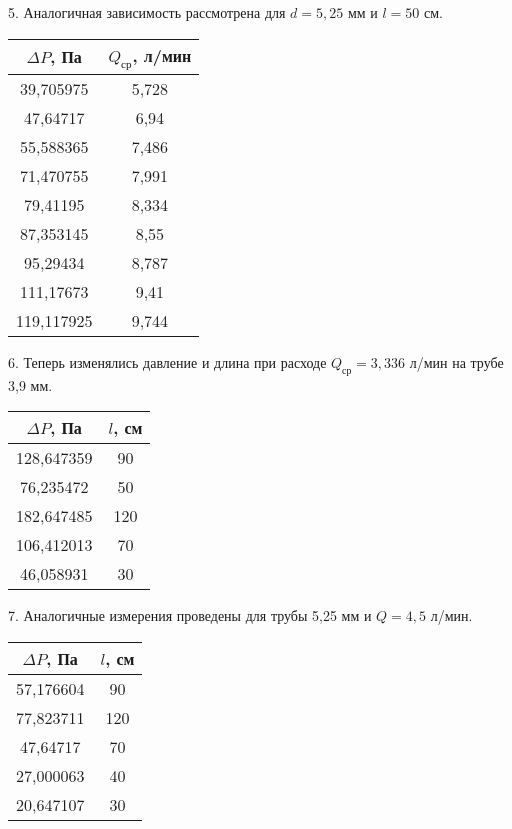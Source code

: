 5. Аналогичная зависимость рассмотрена для $d = 5,25$ мм и $l = 50$ см.
\begin{center}
\begin{tabular}[h]{|c|c|}
   \hline
    $\Delta P$, Па & $Q_\text{ср}$, л/мин\\
   \hline
    39,705975 & 5,728 \\
    \hline
    47,64717 & 6,94 \\
    \hline
    55,588365 & 7,486 \\
    \hline
    71,470755 & 7,991 \\
    \hline
    79,41195 & 8,334 \\
    \hline
    87,353145 & 8,55 \\
    \hline
    95,29434 & 8,787 \\
    \hline
    111,17673 & 9,41 \\
    \hline
    119,117925 & 9,744 \\
    \hline
\end{tabular}
\end{center}

6. Теперь изменялись давление и длина при расходе $Q_\text{ср} = 3,336$ л/мин на трубе 3,9 мм.
\begin{center}
\begin{tabular}[h]{|c|c|}
    \hline
    $\Delta P$, Па & $l$, см \\
    \hline
    128,647359 & 90 \\
   \hline
   76,235472 & 50 \\
   \hline
   182,647485 & 120 \\
   \hline
   106,412013 & 70 \\
   \hline
   46,058931 & 30 \\
   \hline
\end{tabular}
\end{center}

7. Аналогичные измерения проведены для трубы 5,25 мм и $Q = 4,5$ л/мин.
\begin{center}
\begin{tabular}[h]{|c|c|}
    \hline
    $\Delta P$, Па & $l$, см \\
    \hline
    57,176604 & 90 \\
    \hline
    77,823711 & 120 \\
    \hline
    47,64717 & 70 \\
    \hline
    27,000063 & 40 \\
    \hline
    20,647107 & 30 \\
    \hline
\end{tabular}
\end{center}

